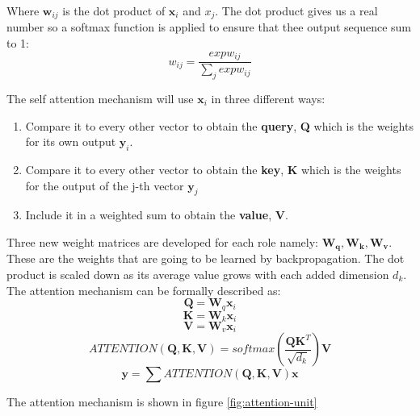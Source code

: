 Where $\mathbf{w}_{ij}$ is the dot product of $\mathbf{x}_i$ and ${x}_j$. The dot product gives us a real number so a softmax function is applied to ensure that thee output sequence sum to 1:
\begin{equation}
    w_{ij} = \frac{exp w_{ij}}{\sum_j exp w_{ij}}
\end{equation}

The self attention mechanism will use $\mathbf{x}_i$  in three different ways:
\begin{enumerate}
    \item Compare it to every other vector to obtain the \textbf{query}, \textbf{Q} which is the weights for its own output $\mathbf{y}_i$.
    \item Compare it to every other vector to obtain the \textbf{key},  \textbf{K} which is the weights for the output of the j-th vector $\mathbf{y}_j$
    \item Include it in a weighted sum to  obtain the \textbf{value},  \textbf{V}.

\end{enumerate}

Three new weight matrices are developed for each role namely: $\mathbf{W_q}, \mathbf{W_k}, \mathbf{W_v}$. These are the weights that are going to be learned by backpropagation. The dot product is scaled down as its average value grows with each added dimension $d_k$. The attention mechanism can be formally described as:
\begin{equation}
\mathbf{Q} = \mathbf{W}_q \mathbf{x}_i
\end{equation}
\begin{equation}
    \mathbf{K} = \mathbf{W}_k \mathbf{x}_i
\end{equation}
\begin{equation}
    \mathbf{V} = \mathbf{W}_v \mathbf{x}_i 
\end{equation}
\begin{equation}
    ATTENTION(\mathbf{Q,K,V}) = softmax(\frac{\mathbf{Q} \mathbf{K}^T}{\sqrt{d_k}})\mathbf{V}
\end{equation}
\begin{equation}
    \mathbf{y} = \sum ATTENTION(\mathbf{Q,K,V})\mathbf{x}    
\end{equation}

The attention mechanism is shown in figure \ref{fig:attention-unit}

